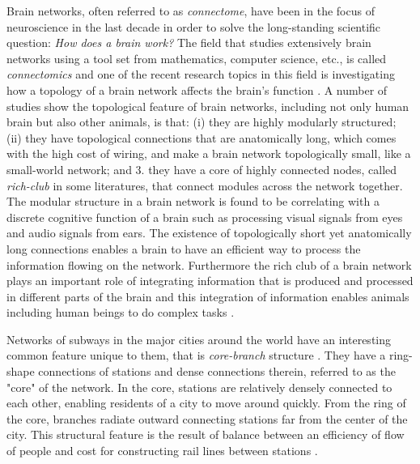 \documentclass[..]{revtex4}
\begin{document}
Brain networks, often referred to as \textit{connectome}, have been in the focus of neuroscience in the last decade in order to solve the long-standing scientific question: \textit{How does a brain work?}  The field that studies extensively brain networks using a tool set from mathematics, computer science, etc., is called \textit{connectomics} and one of the recent research topics in this field is investigating how a topology of a brain network affects the brain's function \cite{ComparativeConnectome}. A number of studies show the topological feature of brain networks, including not only human brain but also other animals, is that: (i) they are highly modularly structured; (ii) they have topological connections that are anatomically long, which comes with the high cost of wiring, and make a brain network topologically small, like a small-world network; and 3. they have a core of highly connected nodes, called \textit{rich-club} in some literatures, that connect modules across the network together. The modular structure in a brain network is found to be correlating with a discrete cognitive function of a brain such as processing visual signals from eyes and audio signals from ears. The existence of topologically short yet anatomically long connections enables a brain to have an efficient way to process the information flowing on the network. Furthermore the rich club of a brain network plays an important role of integrating information that is produced and processed in different parts of the brain and this integration of information enables animals including human beings to do complex tasks \cite{BrainEconomy}.

Networks of subways in the major cities around the world have an interesting common feature unique to them, that is \textit{core-branch} structure \cite{Train}. They have a ring-shape connections of stations and dense connections therein, referred to as the "core" of the network. In the core, stations are relatively densely connected to each other, enabling residents of a city to move around quickly. From the ring of the core, branches radiate outward connecting stations far from the center of the city. This structural feature is the result of balance between an efficiency of flow of people and cost for constructing rail lines between stations \cite{SpatioalNetwork1,SpatioalNetwork2}. 


	
\end{document}
